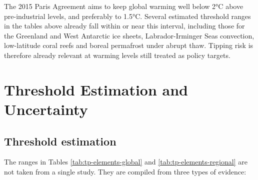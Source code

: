 \documentclass[
]{krantz}
\begin{document}
\begin{table}[!h]
\centering
\caption{\label{tab:tp-elements-regional}Regional-impact tipping elements and their estimated temperature thresholds above pre-industrial levels. Source: Armstrong McKay et al. (2022), Table 1.}
\centering
{}
\end{table}

The 2015 Paris Agreement aims to keep global warming well below 2°C above
pre-industrial levels, and preferably to 1.5°C. Several estimated threshold
ranges in the tables above already fall within or near this interval,
including those for the Greenland and West Antarctic ice sheets,
Labrador-Irminger Seas convection, low-latitude coral reefs and boreal
permafrost under abrupt thaw. Tipping risk is therefore already relevant at
warming levels still treated as policy targets.

\section{Threshold Estimation and Uncertainty}\label{tp-thresholds}

\subsection{Threshold estimation}\label{threshold-estimation}

The ranges in Tables \ref{tab:tp-elements-global} and
\ref{tab:tp-elements-regional} are not taken from a single study.
They are compiled from three types of evidence:
\end{document}
